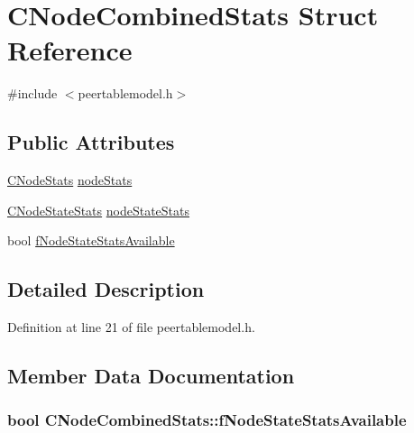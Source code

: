 \hypertarget{struct_c_node_combined_stats}{}\section{C\+Node\+Combined\+Stats Struct Reference}
\label{struct_c_node_combined_stats}


{\ttfamily \#include $<$peertablemodel.\+h$>$}

\subsection*{Public Attributes}
\begin{DoxyCompactItemize}
\item 
\hyperlink{class_c_node_stats}{C\+Node\+Stats} \hyperlink{struct_c_node_combined_stats_ad26d590ef79b08623b2b6658b59e9a69}{node\+Stats}
\item 
\hyperlink{struct_c_node_state_stats}{C\+Node\+State\+Stats} \hyperlink{struct_c_node_combined_stats_a6ce7320fa9ca5a3706ec4caf76ac34a1}{node\+State\+Stats}
\item 
bool \hyperlink{struct_c_node_combined_stats_adc8bd9241fd1f220059b87398fa10fca}{f\+Node\+State\+Stats\+Available}
\end{DoxyCompactItemize}


\subsection{Detailed Description}


Definition at line 21 of file peertablemodel.\+h.



\subsection{Member Data Documentation}
\hypertarget{struct_c_node_combined_stats_adc8bd9241fd1f220059b87398fa10fca}{}
\subsubsection[{f\+Node\+State\+Stats\+Available}]{\setlength{\rightskip}{0pt plus 5cm}bool C\+Node\+Combined\+Stats\+::f\+Node\+State\+Stats\+Available}\label{struct_c_node_combined_stats_adc8bd9241fd1f220059b87398fa10fca}


